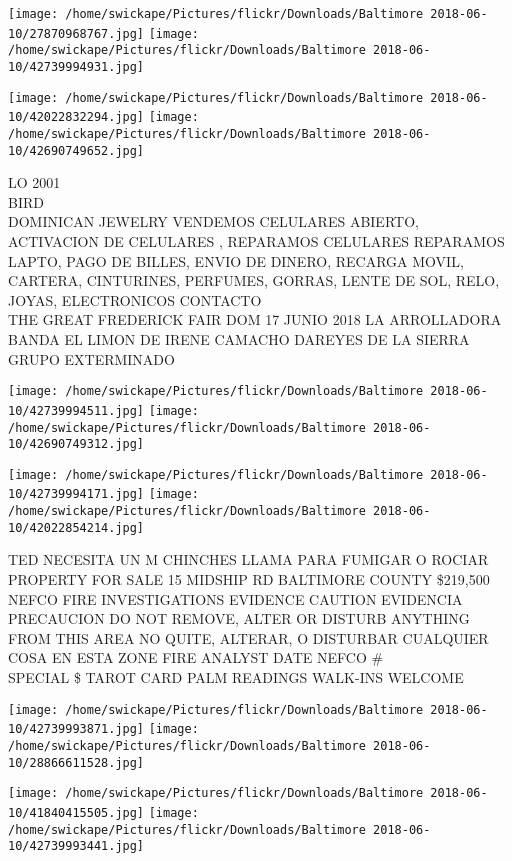 \documentclass[10pt,letterpaper]{article}
\begin{document}
\texttt{[image: /home/swickape/Pictures/flickr/Downloads/Baltimore 2018-06-10/27870968767.jpg]}
\texttt{[image: /home/swickape/Pictures/flickr/Downloads/Baltimore 2018-06-10/42739994931.jpg]}

\texttt{[image: /home/swickape/Pictures/flickr/Downloads/Baltimore 2018-06-10/42022832294.jpg]}
\texttt{[image: /home/swickape/Pictures/flickr/Downloads/Baltimore 2018-06-10/42690749652.jpg]}

LO 2001\\
BIRD\\
DOMINICAN JEWELRY VENDEMOS CELULARES ABIERTO, ACTIVACION DE CELULARES , REPARAMOS CELULARES REPARAMOS LAPTO, PAGO DE BILLES, ENVIO DE DINERO, RECARGA MOVIL, CARTERA, CINTURINES, PERFUMES, GORRAS, LENTE DE SOL, RELO, JOYAS, ELECTRONICOS CONTACTO\\
THE GREAT FREDERICK FAIR DOM 17 JUNIO 2018 LA ARROLLADORA BANDA EL LIMON DE IRENE CAMACHO DAREYES DE LA SIERRA GRUPO EXTERMINADO\\
\pagebreak

\texttt{[image: /home/swickape/Pictures/flickr/Downloads/Baltimore 2018-06-10/42739994511.jpg]}
\texttt{[image: /home/swickape/Pictures/flickr/Downloads/Baltimore 2018-06-10/42690749312.jpg]}

\texttt{[image: /home/swickape/Pictures/flickr/Downloads/Baltimore 2018-06-10/42739994171.jpg]}
\texttt{[image: /home/swickape/Pictures/flickr/Downloads/Baltimore 2018-06-10/42022854214.jpg]}

TED NECESITA UN M CHINCHES LLAMA PARA FUMIGAR O ROCIAR\\
PROPERTY FOR SALE 15 MIDSHIP RD BALTIMORE COUNTY \$219,500\\
NEFCO FIRE INVESTIGATIONS EVIDENCE CAUTION EVIDENCIA PRECAUCION DO NOT REMOVE, ALTER OR DISTURB ANYTHING FROM THIS AREA NO QUITE, ALTERAR, O DISTURBAR CUALQUIER COSA EN ESTA ZONE FIRE ANALYST DATE NEFCO \#\\
SPECIAL \$ TAROT CARD PALM READINGS WALK{-}INS WELCOME\\
\pagebreak

\texttt{[image: /home/swickape/Pictures/flickr/Downloads/Baltimore 2018-06-10/42739993871.jpg]}
\texttt{[image: /home/swickape/Pictures/flickr/Downloads/Baltimore 2018-06-10/28866611528.jpg]}

\texttt{[image: /home/swickape/Pictures/flickr/Downloads/Baltimore 2018-06-10/41840415505.jpg]}
\texttt{[image: /home/swickape/Pictures/flickr/Downloads/Baltimore 2018-06-10/42739993441.jpg]}
\end{document}

